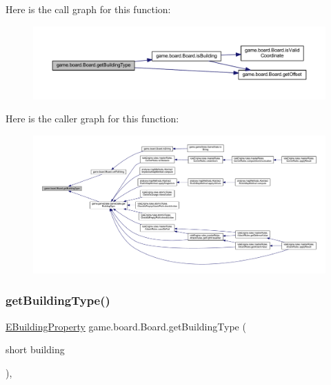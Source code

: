 Here is the call graph for this function\+:
\nopagebreak
\begin{figure}[H]
\begin{center}
\leavevmode
\includegraphics[width=350pt]{classgame_1_1board_1_1_board_ab5376949c9c2ee4fa825e3df27f798ed_cgraph}
\end{center}
\end{figure}
Here is the caller graph for this function\+:
\nopagebreak
\begin{figure}[H]
\begin{center}
\leavevmode
\includegraphics[width=350pt]{classgame_1_1board_1_1_board_ab5376949c9c2ee4fa825e3df27f798ed_icgraph}
\end{center}
\end{figure}
\mbox{\label{classgame_1_1board_1_1_board_aaa1ce124b88eb176e48081b54b0d689b}} 
\subsubsection{\texorpdfstring{get\+Building\+Type()}{getBuildingType()}\hspace{0.1cm}{\footnotesize\ttfamily [2/2]}}
{\footnotesize\ttfamily \mbox{\hyperlink{enumrule_engine_1_1entity_1_1_e_building_property}{E\+Building\+Property}} game.\+board.\+Board.\+get\+Building\+Type (\begin{DoxyParamCaption}\item[{short}]{building }\end{DoxyParamCaption})\hspace{0.3cm}{\ttfamily [inline]}, {\ttfamily [private]}}

